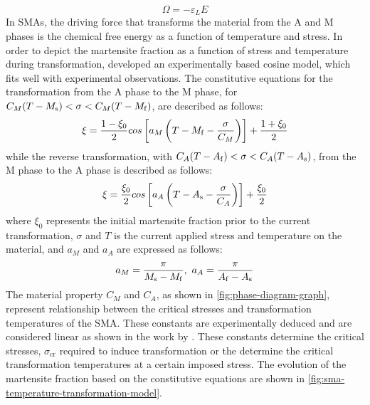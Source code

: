 \begin{equation}
  \label{eq:tensor-youngsmodulus}
  \Omega = -\varepsilon_L E
\end{equation}
In SMAs, the driving force that transforms the material from the A and M phases is the chemical free energy as a function of temperature and stress. In order to depict the martensite fraction as a function of stress and temperature during transformation, \cite{liangConstitutiveModelingShape1990a} developed an experimentally based cosine model, which fits well with experimental observations. The constitutive equations for the transformation from the A phase to the M phase, for $C_M(T-M_\mathrm{s})<\sigma<C_M(T-M_\mathrm{f})$, are described as follows:
\begin{equation}
  \label{eq:liang-MA}
  \xi=\frac{1-\xi_0}{2}cos\left[a_M\left(T-M_\mathrm{f}-\frac{\sigma}{C_M}\right)\right]+\frac{1+\xi_0}{2}
\end{equation}
while the reverse transformation, with $C_A(T-A_\mathrm{f})<\sigma<C_A(T-A_\mathrm{s})$, from the M phase to the A phase is described as follows:
\begin{equation}
  \label{eq:liang-AM}
  \xi=\frac{\xi_0}{2}cos\left[a_A\left(T-A_\mathrm{s}-\frac{\sigma}{C_A}\right)\right]+\frac{\xi_0}{2}
\end{equation}
where $\xi_0$ represents the initial martensite fraction prior to the current transformation, $\sigma$ and $T$ is the current applied stress and temperature on the material, and $a_M$ and $a_A$ are expressed as follows:
\begin{equation}
  \label{eq:aM-aA}
  a_M=\frac{\pi}{M_\mathrm{s}-M_\mathrm{f}},~a_A=\frac{\pi}{A_\mathrm{f}-A_\mathrm{s}}
\end{equation}
The material property $C_M$ and $C_A$, as shown in \cref{fig:phase-diagram-graph}, represent relationship between the critical stresses and transformation temperatures of the SMA. These constants are experimentally deduced and are considered linear as shown in the work by \cite{yooDevelopmentMartensiteTransformation2015}. These constants determine the critical stresses, $\sigma_\mathrm{cr}$ required to induce transformation or the determine the critical transformation temperatures at a certain imposed stress. The evolution of the martensite fraction based on the constitutive equations are shown in \cref{fig:sma-temperature-transformation-model}.


